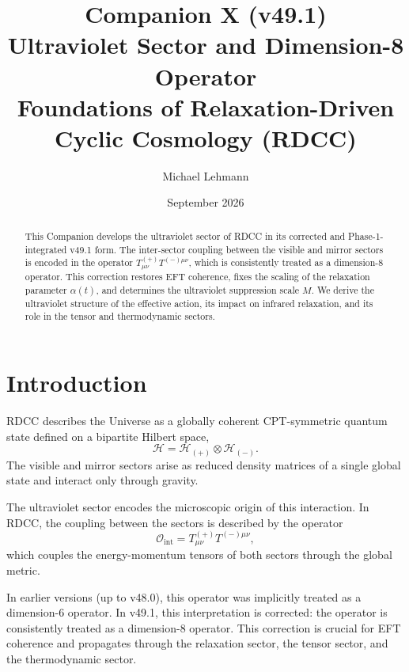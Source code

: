 \documentclass[11pt,a4paper]{article}
\title{\textbf{Companion X (v49.1)}\\[0.2cm]
\textbf{Ultraviolet Sector and Dimension-8 Operator}\\[0.2cm]
\large Foundations of Relaxation-Driven Cyclic Cosmology (RDCC)}
\author[1]{Michael Lehmann}
\affil[1]{\small Independent Researcher, Relaxation-Driven Cyclic Cosmology (RDCC)\\
\texttt{mi.lehmann@gmx.de}}
\date{September 2026}
\begin{document}
\maketitle


\begin{abstract}
This Companion develops the ultraviolet sector of RDCC in its corrected and
Phase-1-integrated v49.1 form. The inter-sector coupling between the visible
and mirror sectors is encoded in the operator $T^{(+)}_{\mu\nu}T^{(-)\mu\nu}$,
which is consistently treated as a dimension-8 operator. This correction
restores EFT coherence, fixes the scaling of the relaxation parameter
$\alpha(t)$, and determines the ultraviolet suppression scale $M$. We derive
the ultraviolet structure of the effective action, its impact on infrared
relaxation, and its role in the tensor and thermodynamic sectors.
\end{abstract}

\tableofcontents
\newpage

\section{Introduction}

RDCC describes the Universe as a globally coherent CPT-symmetric quantum state
defined on a bipartite Hilbert space,
\begin{equation}
\mathcal{H} = \mathcal{H}_{(+)} \otimes \mathcal{H}_{(-)}.
\end{equation}
The visible and mirror sectors arise as reduced density matrices of a single
global state and interact only through gravity.

The ultraviolet sector encodes the microscopic origin of this interaction. In
RDCC, the coupling between the sectors is described by the operator
\begin{equation}
\mathcal{O}_{\mathrm{int}} = T^{(+)}_{\mu\nu} T^{(-)\mu\nu},
\end{equation}
which couples the energy-momentum tensors of both sectors through the global
metric.

In earlier versions (up to v48.0), this operator was implicitly treated as a
dimension-6 operator. In v49.1, this interpretation is corrected: the operator
is consistently treated as a dimension-8 operator. This correction is crucial
for EFT coherence and propagates through the relaxation sector, the tensor
sector, and the thermodynamic sector.
\end{document}
